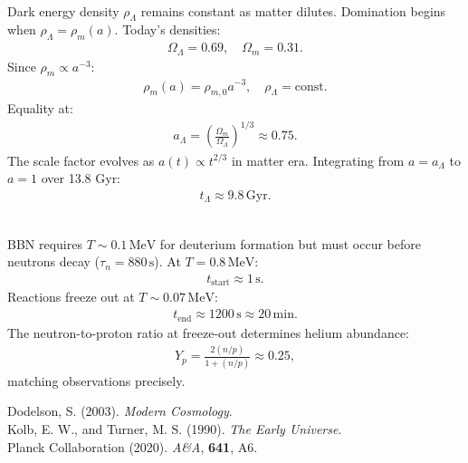 \begin{technical}
\\[0.25em]
Dark energy density \(\rho_\Lambda\) remains constant as matter dilutes. Domination begins when \(\rho_\Lambda = \rho_m(a)\). Today's densities:
\begin{align*}
\Omega_\Lambda = 0.69, \quad \Omega_m = 0.31.
\end{align*}
Since \(\rho_m \propto a^{-3}\):
\begin{align*}
\rho_m(a) = \rho_{m,0} a^{-3}, \quad \rho_\Lambda = \text{const.}
\end{align*}
Equality at:
\begin{align*}
a_\Lambda = \left(\frac{\Omega_m}{\Omega_\Lambda}\right)^{1/3} \approx 0.75.
\end{align*}
The scale factor evolves as \(a(t) \propto t^{2/3}\) in matter era. Integrating from \(a = a_\Lambda\) to \(a = 1\) over 13.8 Gyr:
\begin{align*}
t_\Lambda \approx 9.8\,\text{Gyr}.
\end{align*}

\\[0.25em]
BBN requires \(T \sim 0.1\,\text{MeV}\) for deuterium formation but must occur before neutrons decay (\(\tau_{n} = 880\,\text{s}\)). At \(T = 0.8\,\text{MeV}\):
\begin{align*}
t_{\text{start}} \approx 1\,\text{s}.
\end{align*}
Reactions freeze out at \(T \sim 0.07\,\text{MeV}\):
\begin{align*}
t_{\text{end}} \approx 1200\,\text{s} \approx 20\,\text{min}.
\end{align*}
The neutron-to-proton ratio at freeze-out determines helium abundance:
\begin{align*}
Y_p = \frac{2(n/p)}{1 + (n/p)} \approx 0.25,
\end{align*}
matching observations precisely.

\techref
{\footnotesize
Dodelson, S. (2003). \textit{Modern Cosmology}.\\
Kolb, E. W., and Turner, M. S. (1990). \textit{The Early Universe}.\\
Planck Collaboration (2020). \textit{A\&A}, \textbf{641}, A6.
}
\end{technical}
